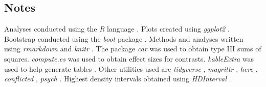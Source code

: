 \documentclass[11pt,]{article}
\begin{document}
\hypertarget{notes}{%
\subsection{Notes}\label{notes}}

Analyses conducted using the \textit{R} language
\citep{rcoreteamLanguageEnvironmentStatistical2019}. Plots created using
\textit{ggplot2} \citep{wickhamGgplot2ElegantGraphics2016}. Bootstrap
conducted using the \textit{boot} package
\citep{cantyBootBootstrapSPlus2017}. Methods and analyses written using
\textit{rmarkdown} \citep{allaireRmarkdownDynamicDocuments2019} and
\textit{knitr} \citep{xieKnitrGeneralPurposePackage2019}. The package
\textit{car} \citep{foxCompanionAppliedRegression2011} was used to
obtain type III sums of squares. \textit{compute.es}
\citep{reComputeEsCompute2013} was used to obtain effect sizes for
contrasts. \textit{kableExtra} was used to help generate tables
\citep{zhuKableExtraConstructComplex2019}. Other utilities used are
\textit{tidyverse} \citep{wickhamTidyverseEasilyInstall2017},
\textit{magrittr} \citep{bacheMagrittrForwardPipeOperator2014},
\textit{here} \citep{mullerHereSimplerWay2017}, \textit{conflicted}
\citep{wickhamConflictedAlternativeConflict2018}, \textit{psych}
\citep{revellePsychProceduresPsychological2018}. Highest density
intervals obtained using \textit{HDInterval}
\citep{meredithHDIntervalHighestPosterior2018}.



\end{document}
